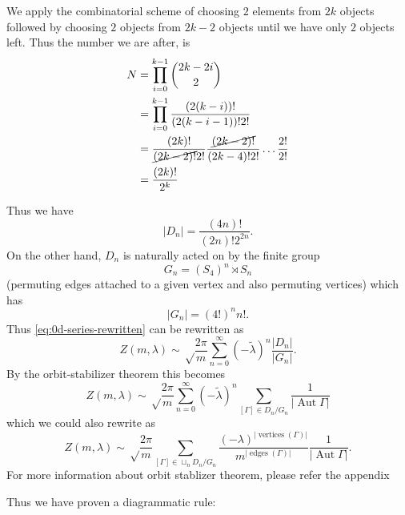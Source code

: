 \documentclass[12pt,letterpaper,reqno]{article}
\numberwithin{equation}{section}
\newcommand{\abs}[1]{\lvert#1\rvert}
\newcommand{\tlambda}{\widetilde\lambda}
\DeclareMathOperator{\Aut}{Aut}
\DeclareMathOperator{\vertices}{vertices}
\DeclareMathOperator{\edges}{edges}
\begin{document}
\begin{solution}
  We apply the combinatorial scheme of choosing $2$ elements from $2k$ objects followed by choosing $2$ objects from $2k-2$ objects until we have only $2$ objects left.  Thus the number we are after, is 
  \begin{equation}
    \begin{split}
    N &= \prod_{i=0}^{k-1} {2k-2i\choose 2}\\
    &= \prod_{i=0}^{k-1} {\frac{(2(k-i))!}{(2(k-i-1))!2!}}\\
    &= \frac{(2k)!}{\cancel{(2k-2)!}2!}\frac{\cancel{(2k-2)!}}{(2k-4)!2!}\ldots\frac{2!}{2!}\\
    &= \frac{(2k)!}{2^k}
    \end{split}
  \end{equation}
\color{red}{I have to still explain the $k!$ factor.}
\end{solution}

Thus we have
\begin{equation}
  \abs{D_n} = \frac{(4n)!}{(2n)! 2^{2n}}.
\end{equation}
On the other hand, $D_n$ is naturally acted on by the finite group
\begin{equation}
  G_n = (S_4)^n \rtimes S_n
\end{equation}
(permuting edges attached to a given vertex and also permuting vertices)
which has 
\begin{equation}
 \abs{G_n} = (4!)^n n!. 
\end{equation}
Thus \eqref{eq:0d-series-rewritten} can be rewritten as
\begin{equation}
  Z(m, \lambda) \sim \sqrt\frac{2\pi}{m} \sum_{n=0}^\infty (-\tlambda)^n \frac{\abs{D_n}}{\abs{G_n}}.
\end{equation}
By the orbit-stabilizer theorem this becomes
\begin{equation}
  Z(m, \lambda) \sim \sqrt\frac{2\pi}{m} \sum_{n=0}^\infty (-\tlambda)^n \sum_{[\Gamma] \in D_n / G_n} \frac{1}{\abs{\Aut \Gamma}}
\end{equation}
which we could also rewrite as
\begin{equation}
  Z(m, \lambda) \sim \sqrt\frac{2\pi}{m} \sum_{[\Gamma] \in \sqcup_n D_n / G_n} \frac{(-\lambda)^{\abs{\vertices(\Gamma)}}}{m^{\abs{\edges(\Gamma)}}} \frac{1}{\abs{\Aut \Gamma}}.
\end{equation}
For more information about orbit stablizer theorem, please refer the appendix 

Thus we have proven a diagrammatic rule:
\end{document}
